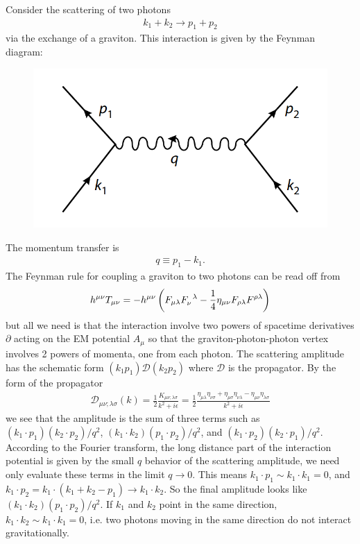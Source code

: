 \documentclass{book}
\theoremstyle{definition}
\newcommand{\p}{\partial}
\newcommand{\f}[2]{\frac{#1}{#2}}
\newcommand{\lp}{\left(}
\newcommand{\rp}{\right)}
\newcommand{\D}{\mathcal{D}}
\begin{document}
Consider the scattering of two photons
\begin{align}
k_1 + k_2 \to p_1 + p_2
\end{align}
via the exchange of a graviton. This interaction is given by the Feynman diagram:
\begin{figure}[!htb]
	\centering
	\includegraphics[scale=0.35]{graviton}
\end{figure}
The momentum transfer is
\begin{align}
q \equiv p_1 - k_1.
\end{align}
The Feynman rule for coupling a graviton to two photons can be read off from 
\begin{align}
h^{\mu\nu}T_{\mu\nu} = -h^{\mu\nu}\lp F_{\mu\lambda}\tensor{F}{_\nu^\lambda} - \f{1}{4}\eta_{\mu\nu}F_{\rho\lambda}F^{\rho\lambda} \rp
\end{align}
but all we need is that the interaction involve two powers of spacetime derivatives $\p$ acting on the EM potential $A_\mu$ so that the graviton-photon-photon vertex involves 2 powers of momenta, one from each photon. The scattering amplitude has the schematic form $(k_1p_1)\D(k_2p_2)$ where $\D$ is the propagator. By the form of the propagator
\begin{align}
\D_{\mu\nu;\lambda\sigma}(k) = \f{1}{2}\f{K_{\mu\nu;\lambda\sigma}}{k^2 + i\epsilon} = \f{1}{2}\f{\eta_{\mu\lambda}\eta_{\nu\sigma} +\eta_{\mu\sigma}\eta_{\nu\lambda} - \eta_{\mu\nu}\eta_{\lambda\sigma}}{k^2 + i\epsilon}
\end{align}
we see that the amplitude is the sum of three terms such as $(k_1 \cdot p_1)(k_2\cdot p_2)/q^2$, $(k_1\cdot k_2)(p_1\cdot p_2)/q^2$, and $(k_1\cdot p_2)(k_2 \cdot p_1)/q^2$. According to the Fourier transform, the long distance part of the interaction potential is given by the small $q$ behavior of the scattering amplitude, we need only evaluate these terms in the limit $q\to 0$. This means $k_1 \cdot p_1 \sim k_1 \cdot k_1 = 0$, and $k_1\cdot p_2 = k_1 \cdot (k_1 + k_2 - p_1) \to k_1 \cdot k_2$. So the final amplitude looks like $(k_1 \cdot k_2)(p_1 \cdot p_2)/q^2$. If $k_1$ and $k_2$ point in the same direction, $k_1 \cdot k_2 \sim k_1 \cdot k_1 = 0$, i.e. two photons moving in the same direction do not interact gravitationally. \\
\end{document}
